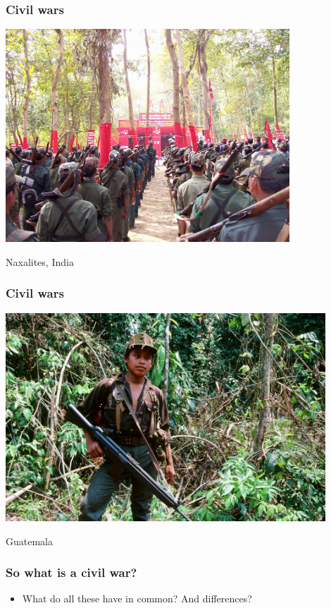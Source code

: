 \documentclass[aspectratio=43]{beamer}
\begin{document}
\begin{frame}
\frametitle{Civil wars}
\centering

\includegraphics[width = 0.8\textwidth]{img/naxalites}

Naxalites, India

\end{frame}

\begin{frame}
\frametitle{Civil wars}
\centering

\includegraphics[width = 0.9\textwidth]{img/ixcan1988}

Guatemala

\end{frame}


\begin{frame}
\frametitle{So what is a civil war?}
\centering

\begin{itemize}
  \item What do all these have in common? And differences?
\end{itemize}

\end{frame}
\end{document}
